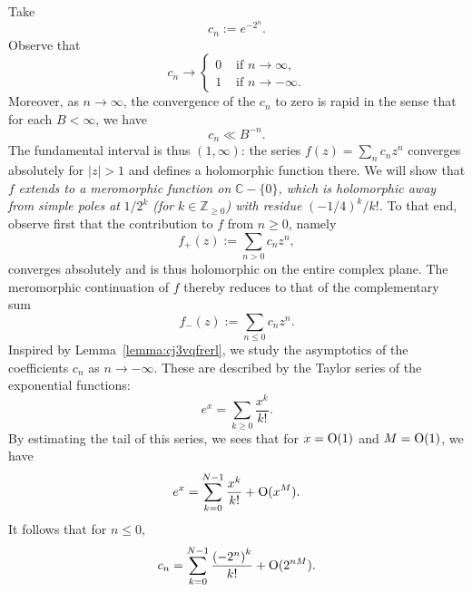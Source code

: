 \documentclass[reqno]{amsart}  \numberwithin{theorem}{section} \numberwithin{equation}{section}
\begin{document}
\begin{example}
  Take
  \begin{equation*}
    c_n:= e^{- 2^n }.
  \end{equation*}
  Observe that
  \begin{equation*}
    c_n \rightarrow
    \begin{cases}
      0 &  \text{ if } n \rightarrow \infty, \\
      1 & \text{ if } n \rightarrow - \infty.
    \end{cases}
  \end{equation*}
  Moreover, as $n \rightarrow \infty$, the convergence of the $c_n$ to zero is rapid in the sense that for each $B < \infty$, we have
  \begin{equation*}
    c_n \ll B^{-n}.
  \end{equation*}
  The fundamental interval is thus $(1,\infty)$: the series $f(z) = \sum_{n} c_n z^n$ converges absolutely for $|z| > 1$ and defines a holomorphic function there.  We will show that $f$ \emph{extends to a meromorphic function on} $\mathbb{C} - \{0\}$\emph{, which is holomorphic away from simple poles at} $1 / 2^k$ \emph{(for} $k \in \mathbb{Z}_{\geq 0}$\emph{) with residue} $(-1/4)^k / k!$\emph{.}  To that end, observe first that the contribution to $f$ from $n \geq 0$, namely
  \begin{equation*}
    f_+(z) := \sum_{n > 0} c_n z^n,
  \end{equation*}
  converges absolutely and is thus holomorphic on the entire complex plane.  The meromorphic continuation of $f$ thereby reduces to that of the complementary sum
  \begin{equation*}
    f_-(z) := \sum_{n \leq  0} c_n z^n.
  \end{equation*}
  Inspired by Lemma~\ref{lemma:cj3vqfrerl}, we study the asymptotics of the coefficients $c_n$ as $n \rightarrow - \infty$.  These are described by the Taylor series of the exponential functions:
  \begin{equation*}
    e^{x} = \sum_{k \geq 0} \frac{x^k }{k!}.
  \end{equation*}
  By estimating the tail of this series, we sees that for $x = \operatorname{O}(1)$ and $M = \operatorname{O}(1)$, we have
  \begin{equation*}
    e^x = \sum_{k = 0}^{N-1} \frac{x^k}{k!} + \operatorname{O} (x^M).
  \end{equation*}
  It follows that for $n \leq 0$,
  \begin{equation}\label{eq:cj3wnu8lqf}
    c_n = \sum_{k = 0}^{N-1} \frac{{(-2^n)}^k}{k!} + \O (2^{nM}).

\end{equation}
\end{example}
\end{document}
